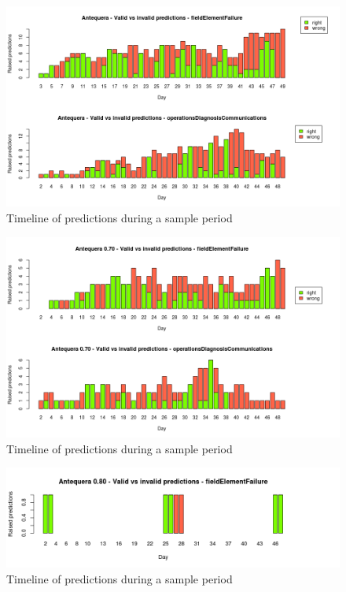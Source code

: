 \documentclass[a4paper,12pt]{article}
\begin{document}
\begin{figure}[hbtp]
\includegraphics[width=\textwidth]{img/scenario_right_wrong.png}
\caption{Timeline of predictions during a sample period} \label{fig:scenario_right_wrong}
\end{figure}

\begin{figure}[hbtp]
\includegraphics[width=\textwidth]{img/scenario_right_wrong_70.png}
\caption{Timeline of predictions during a sample period} \label{fig:scenario_right_wrong_70}
\end{figure}

\begin{figure}[hbtp]
\includegraphics[width=\textwidth]{img/scenario_right_wrong_80.png}
\caption{Timeline of predictions during a sample period} \label{fig:scenario_right_wrong_80}
\end{figure}
\end{document}
